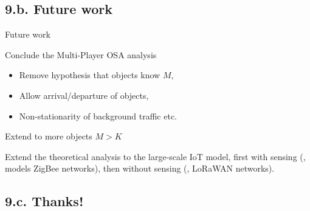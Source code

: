 \documentclass[12pt,english,ignorenonframetext,aspectratio=169,]{beamer}
\begin{document}
\subsection{\hfill{}9.b. Future work\hfill{}}

\begin{frame}{Future work}

\begin{block}{Conclude the Multi-Player OSA analysis}

\begin{itemize}
\item
  Remove hypothesis that objects know \(M\),
\item
  Allow arrival/departure of objects,
\item
  Non-stationarity of background traffic etc.
\end{itemize}

\pause

\end{block}

\begin{block}{Extend to more objects \(M > K\)}

Extend the theoretical analysis to the large-scale IoT model, first
with sensing (\eg, models ZigBee networks), then without sensing (\eg,
LoRaWAN networks).

\end{block}

\end{frame}



\subsection{\hfill{}9.c. Thanks!\hfill{}}
\end{document}
